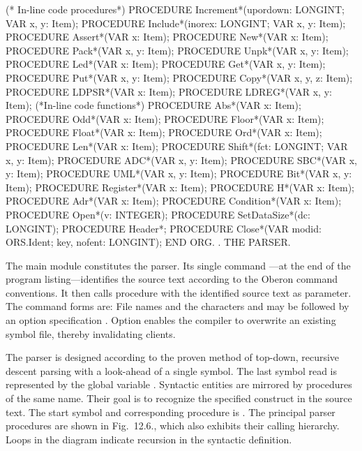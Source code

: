   (* In-line code procedures*)
  PROCEDURE Increment*(upordown: LONGINT; VAR x, y: Item);
  PROCEDURE Include*(inorex: LONGINT; VAR x, y: Item);
  PROCEDURE Assert*(VAR x: Item);
  PROCEDURE New*(VAR x: Item);
  PROCEDURE Pack*(VAR x, y: Item);
  PROCEDURE Unpk*(VAR x, y: Item);
  PROCEDURE Led*(VAR x: Item);
  PROCEDURE Get*(VAR x, y: Item);
  PROCEDURE Put*(VAR x, y: Item);
  PROCEDURE Copy*(VAR x, y, z: Item);
  PROCEDURE LDPSR*(VAR x: Item);
  PROCEDURE LDREG*(VAR x, y: Item);
  (*In-line code functions*)
  PROCEDURE Abs*(VAR x: Item);
  PROCEDURE Odd*(VAR x: Item);
  PROCEDURE Floor*(VAR x: Item);
  PROCEDURE Float*(VAR x: Item);
  PROCEDURE Ord*(VAR x: Item);
  PROCEDURE Len*(VAR x: Item);
  PROCEDURE Shift*(fct: LONGINT; VAR x, y: Item);
  PROCEDURE ADC*(VAR x, y: Item);
  PROCEDURE SBC*(VAR x, y: Item);
  PROCEDURE UML*(VAR x, y: Item);
  PROCEDURE Bit*(VAR x, y: Item);
  PROCEDURE Register*(VAR x: Item);
  PROCEDURE H*(VAR x: Item);
  PROCEDURE Adr*(VAR x: Item);
  PROCEDURE Condition*(VAR x: Item);
  PROCEDURE Open*(v: INTEGER);
  PROCEDURE SetDataSize*(dc: LONGINT);
  PROCEDURE Header*;
  PROCEDURE Close*(VAR modid: ORS.Ident; key, nofent: LONGINT);
END ORG.
\endtt
\eject
{}. THE PARSER.

The main module  constitutes the parser. Its single command ---at the end of the program listing---identifies the source text according to the Oberon command conventions. It then calls procedure  with the identified source text as parameter. The command forms are:
\noindent File names and the characters  and \code{^} may be followed by an option specification . Option  enables the compiler to overwrite an existing symbol file, thereby invalidating clients.

The parser is designed according to the proven method of top-down, recursive descent parsing with a look-ahead of a single symbol. The last symbol read is represented by the global variable . Syntactic entities are mirrored by procedures of the same name. Their goal is to recognize the specified construct in the source text. The start symbol and corresponding procedure is . The principal parser procedures are shown in Fig.~12.6., which also exhibits their calling hierarchy. Loops in the diagram indicate recursion in the syntactic definition.

